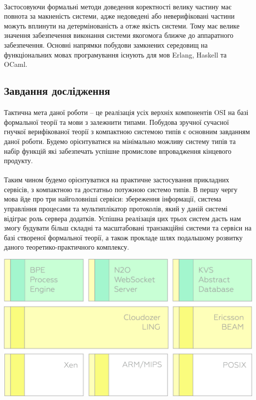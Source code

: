 \documentclass[11pt,oneside]{article}
\begin{document}
   \paragraph{}
   Застосовуючи формальні методи доведення коректності велику частину має повнота за макненість системи,
   адже недоведені або неверифіковані частини можуть вплинути на детермінованість а отже якість системи.
   Тому має велике значення забезпечення виконання системи якогомога ближче до аппаратного забезпечення.
   Основні напрямки побудови замкнених середовищ на функціональних мовах програмування існують для мов Erlang, Haskell та OCaml.

\newpage
\subsection{Завдання дослідження}
\vspace{0.5cm}

   \paragraph{}
   Тактична мета даної роботи -- це реалізація усіх верхніх компонентів OSI на базі
   формальної теорії та мови з залежнити типами. Побудова зручної сучасної гнучкої верифікованої теорії
   з компактною системою типів є основним завданням даної роботи. Будемо орієнтуватися
   на мінімально можливу систему типів та набір функцій які забезпечать успішне промислове
   впровадження кінцевого продукту.

   \paragraph{}
   Таким чином будемо орієнтуватися на практичне застосування прикладних сервісів,
   з компактною та достатньо потужною системо типів. В першу чергу мова йде про три найголовніші
   сервіси: збереження інформації, система управління процесами та мультиплікатор протоколів,
   який у даній системі відіграє роль сервера додатків. Успішна реалізація цих трьох систем
   дасть нам змогу будувати більш складні та масштабовані транзакційні системи та сервіси на базі
   створеної формальної теорії, а також прокладе шлях подальшому розвитку даного
   теоретико-практичного комплексу.

   \begin{center}
   \vspace{0.5cm}
   \includegraphics[scale=0.15]{img/exe-res}
   \end{center}
\end{document}
